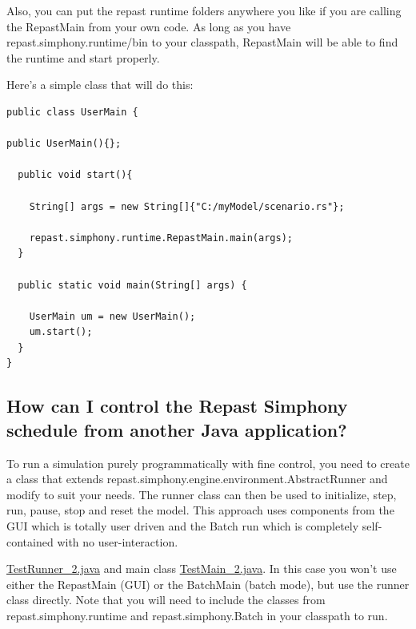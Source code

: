 \documentclass[11pt]{article}
\begin{document}
Also, you can put the repast runtime folders anywhere you like if you are calling the RepastMain from your own code. As long as you have repast.simphony.runtime/bin to your classpath, RepastMain will be able to find the runtime and start properly.

Here's a simple class that will do this:

\noindent\begin{minipage}[h]{\textwidth}
\vspace{.2in}
\lstset{language=java}
\begin{lstlisting}
public class UserMain {

public UserMain(){};

  public void start(){

    String[] args = new String[]{"C:/myModel/scenario.rs"};

    repast.simphony.runtime.RepastMain.main(args);
  }

  public static void main(String[] args) {

    UserMain um = new UserMain();
    um.start();
  }
}
\end{lstlisting}
\vspace{.2in}
\end{minipage}


\subsection{How can I control the Repast Simphony schedule from another Java application?}
\label{prs:schedule_java}
To run a simulation purely programmatically with fine control, you need to create a class that extends repast.simphony.engine.environment.AbstractRunner and modify to suit your needs. The runner class can then be used to initialize, step, run, pause, stop and reset the model. This approach uses components from the GUI which is totally user driven and the Batch run which is completely self-contained with no user-interaction.

\href{http://repast.sourceforge.net/docs/TestRunner_2.java}{TestRunner\_2.java} and main class \href{http://repast.sourceforge.net/docs/TestMain_2.java}{TestMain\_2.java}. In this case you won't use either the RepastMain (GUI) or the BatchMain (batch mode), but use the runner class directly. Note that you will need to include the classes from repast.simphony.runtime and repast.simphony.Batch in your classpath to run.
\end{document}
